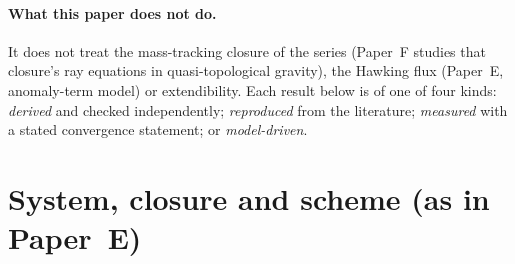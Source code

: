 \documentclass[11pt]{article}
\begin{document}
\paragraph{What this paper does not do.} It does not treat the mass-tracking closure of the series (Paper~F \citep{PaperF} studies that closure's ray equations in quasi-topological gravity), the Hawking flux (Paper~E, anomaly-term model) or extendibility. Each result below is of one of four kinds: \emph{derived} and checked independently; \emph{reproduced} from the literature; \emph{measured} with a stated convergence statement; or \emph{model-driven}.


\section{System, closure and scheme (as in Paper~E)}
\label{sec:nlsetup}
\end{document}
